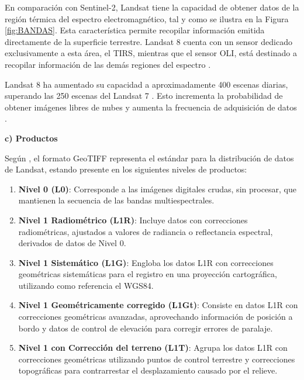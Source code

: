 En comparación con Sentinel-2, Landsat tiene la capacidad de obtener datos de la región térmica del espectro electromagnético, tal y como se ilustra en la Figura \ref{fig:BANDAS}. Esta característica permite recopilar información emitida directamente de la superficie terrestre. Landsat 8 cuenta con un sensor dedicado exclusivamente a esta área, el TIRS, mientras que el sensor OLI, está destinado a recopilar información de las demás regiones del espectro \cite{landsat}.

Landsat 8 ha aumentado su capacidad a aproximadamente 400 escenas diarias, superando las 250 escenas del Landsat 7 \cite{ariza2013descripcion}. Esto incrementa la probabilidad de obtener imágenes libres de nubes y aumenta la frecuencia de adquisición de datos \cite{loveland2016landsat}.

\textbf{c) Productos}

Según , el formato GeoTIFF representa el estándar para la distribución de datos de Landsat, estando presente en los siguientes niveles de productos:

\begin{enumerate}
    \item \textbf{Nivel 0 (L0)}: Corresponde a las imágenes digitales crudas, sin procesar, que mantienen la secuencia de las bandas multiespectrales.

    \item \textbf{Nivel 1 Radiométrico (L1R)}: Incluye datos con correcciones radiométricas, ajustados a valores de radiancia o reflectancia espectral, derivados de datos de Nivel 0.

    \item \textbf{Nivel 1 Sistemático (L1G)}: Engloba los datos L1R con correcciones geométricas sistemáticas para el registro en una proyección cartográfica, utilizando como referencia el WGS84.

    \item \textbf{Nivel 1 Geométricamente corregido (L1Gt)}: Consiste en datos L1R con correcciones geométricas avanzadas, aprovechando información de posición a bordo y datos de control de elevación para corregir errores de paralaje.

    \item \textbf{Nivel 1 con Corrección del terreno (L1T)}: Agrupa los datos L1R con correcciones geométricas utilizando puntos de control terrestre y correcciones topográficas para contrarrestar el desplazamiento causado por el relieve.
\end{enumerate}